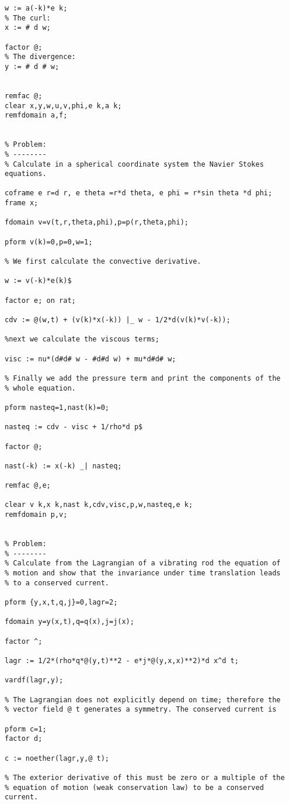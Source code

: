 {\begin{verbatim}
w := a(-k)*e k;
% The curl:
x := # d w;

factor @;
% The divergence:
y := # d # w;


remfac @;
clear x,y,w,u,v,phi,e k,a k;
remfdomain a,f;


% Problem:
% --------
% Calculate in a spherical coordinate system the Navier Stokes equations.

coframe e r=d r, e theta =r*d theta, e phi = r*sin theta *d phi;
frame x;

fdomain v=v(t,r,theta,phi),p=p(r,theta,phi);

pform v(k)=0,p=0,w=1;

% We first calculate the convective derivative.

w := v(-k)*e(k)$

factor e; on rat;

cdv := @(w,t) + (v(k)*x(-k)) |_ w - 1/2*d(v(k)*v(-k));

%next we calculate the viscous terms;

visc := nu*(d#d# w - #d#d w) + mu*d#d# w;

% Finally we add the pressure term and print the components of the
% whole equation.

pform nasteq=1,nast(k)=0;

nasteq := cdv - visc + 1/rho*d p$

factor @;

nast(-k) := x(-k) _| nasteq;

remfac @,e;

clear v k,x k,nast k,cdv,visc,p,w,nasteq,e k;
remfdomain p,v;


% Problem:
% --------
% Calculate from the Lagrangian of a vibrating rod the equation of
% motion and show that the invariance under time translation leads
% to a conserved current.

pform {y,x,t,q,j}=0,lagr=2;

fdomain y=y(x,t),q=q(x),j=j(x);

factor ^;

lagr := 1/2*(rho*q*@(y,t)**2 - e*j*@(y,x,x)**2)*d x^d t;

vardf(lagr,y);

% The Lagrangian does not explicitly depend on time; therefore the
% vector field @ t generates a symmetry. The conserved current is

pform c=1;
factor d;

c := noether(lagr,y,@ t);

% The exterior derivative of this must be zero or a multiple of the
% equation of motion (weak conservation law) to be a conserved current.


\end{verbatim}}

